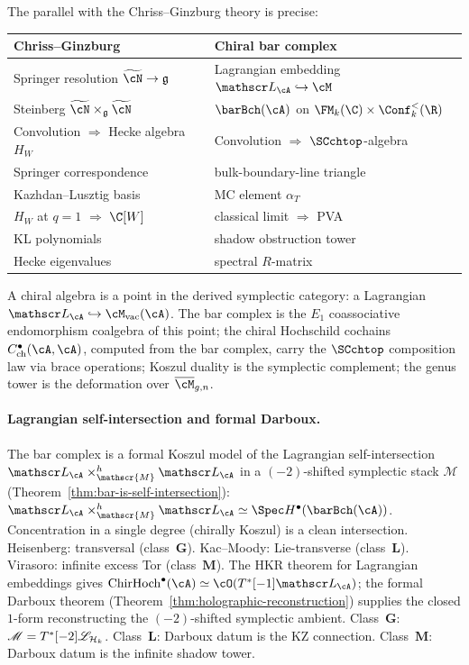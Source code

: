 The parallel with the Chriss--Ginzburg theory is precise:
\begin{center}
\small
\renewcommand{\arraystretch}{1.15}
\begin{tabular}{ll}
\textbf{Chriss--Ginzburg} & \textbf{Chiral bar complex} \\ \hline
Springer resolution
$\widetilde{\cN} \to \fg$
 & Lagrangian embedding
$\cL_\cA \hookrightarrow \cM$ \\[2pt]
Steinberg
$\widetilde{\cN} \times_{\fg} \widetilde{\cN}$
 & $\barBch(\cA)$ on
$\FM_k(\C) \times \Conf_k^{<}(\R)$ \\[2pt]
Convolution $\Rightarrow$ Hecke algebra $H_W$
 & Convolution $\Rightarrow$
$\SCchtop$-algebra \\[2pt]
Springer correspondence
 & bulk-boundary-line triangle \\[2pt]
Kazhdan--Lusztig basis
 & MC element $\alpha_T$ \\[2pt]
$H_W$ at $q=1$ $\Rightarrow$ $\C[W]$
 & classical limit $\Rightarrow$ PVA \\[2pt]
KL polynomials
 & shadow obstruction tower \\[2pt]
Hecke eigenvalues
 & spectral $R$-matrix
\end{tabular}
\end{center}

A chiral algebra is a point in the derived symplectic category:
a Lagrangian $\cL_\cA \hookrightarrow \cM_{\mathrm{vac}}(\cA)$.
The bar complex is the $E_1$ coassociative endomorphism coalgebra
of this point; the chiral Hochschild cochains
$C^\bullet_{\mathrm{ch}}(\cA,\cA)$, computed from the bar
complex, carry the $\SCchtop$ composition law via brace
operations; Koszul duality is the symplectic complement; the
genus tower is the deformation over $\overline{\cM}_{g,n}$.

\paragraph{Lagrangian self-intersection and formal Darboux.}
The bar complex is a formal Koszul model of the Lagrangian
self-intersection
$\cL_\cA \times_{\mathscr{M}}^h \cL_\cA$ in a $(-2)$-shifted
symplectic stack $\mathscr{M}$
(Theorem~\ref{thm:bar-is-self-intersection}):
$\cL_\cA \times_{\mathscr{M}}^h \cL_\cA \simeq
\Spec H^\bullet(\barBch(\cA))$. Concentration in a single
degree (chirally Koszul) is a clean intersection. Heisenberg:
transversal (class~$\mathbf{G}$). Kac--Moody: Lie-transverse
(class~$\mathbf{L}$). Virasoro: infinite excess Tor
(class~$\mathbf{M}$). The HKR theorem for Lagrangian embeddings
gives $\mathrm{ChirHoch}^\bullet(\cA) \simeq \cO(T^*[-1]\cL_\cA)$;
the formal Darboux theorem
(Theorem~\ref{thm:holographic-reconstruction}) supplies the
closed $1$-form reconstructing the $(-2)$-shifted symplectic
ambient. Class~$\mathbf{G}$: $\mathscr{M} = T^*[-2]\mathscr{L}_{\mathcal{H}_k}$.
Class~$\mathbf{L}$: Darboux datum is the KZ connection.
Class~$\mathbf{M}$: Darboux datum is the infinite shadow tower.

